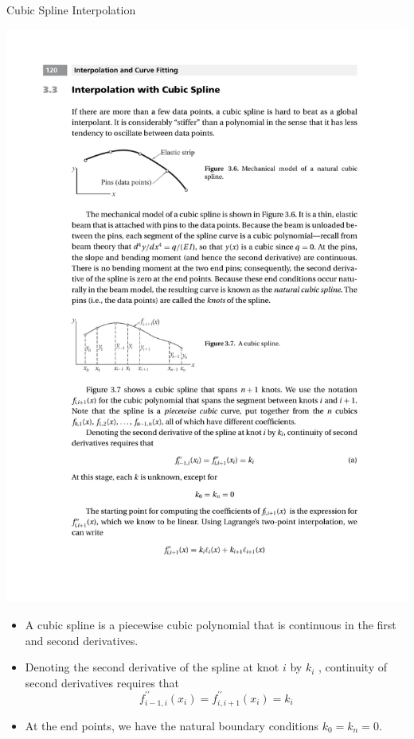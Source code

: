 \documentclass{beamer}
\begin{document}
\begin{frame}{Cubic Spline Interpolation}
  \centerline{\includegraphics[width=0.5\textheight]{Lec9_Fig6.pdf}
   }
  
      \begin{itemize}
        \item A cubic spline is a piecewise cubic polynomial that is continuous in the first and second derivatives.
        \item   Denoting the second derivative of the spline at knot $i$ by $k_i$ , continuity of second derivatives requires that 
        \[
        f_{i-1, i}^{\prime \prime}\left(x_i\right)=f_{i, i+1}^{\prime \prime}\left(x_i\right)=k_i
        \]
        \item At the end points, we have the natural boundary conditions $k_0=k_n=0$.
      \end{itemize}
\end{frame}
\end{document}
